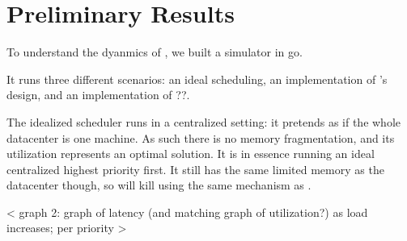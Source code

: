 \section{Preliminary Results}

To understand the dyanmics of \sys{}, we built a simulator in go. 

It runs three different scenarios: an ideal scheduling, an implementation of
\sys{}'s design, and an implementation of ??. 

The idealized scheduler runs in a centralized setting: it pretends as if the
whole datacenter is one machine. As such there is no memory fragmentation, and
its utilization represents an optimal solution. It is in essence running an
ideal centralized highest priority first. It still has the same limited memory
as the datacenter though, so will kill using the same mechanism as \sys{}.



< graph 2: graph of latency (and matching graph of utilization?) as load increases; per priority >

